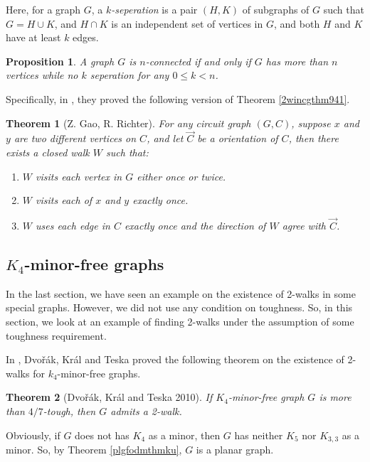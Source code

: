 \documentclass[12pt]{report}
\newtheorem{theorem}{Theorem}
\newtheorem{proposition}{Proposition}
\begin{document}
Here, for a graph $G$, a {\em $k$-seperation} is a pair $(H,K)$ of subgraphs of $G$ such that $G=H\cup K$, and $H\cap K$ is an independent set of vertices in $G$, and both $H$ and $K$ have at least $k$ edges.
\begin{proposition}
A graph $G$ is $n$-connected if and only if $G$ has more than $n$ vertices while no $k$ seperation for any $0\le k<n$.
\end{proposition}

Specifically, in \cite{gao19942}, they proved the following version of Theorem \ref{2wincgthm941}.

\begin{theorem}[Z. Gao, R. Richter]\label{2wincgde942}
For any circuit graph $(G,C)$, suppose $x$ and $y$ are two different vertices on $C$, and let $\vec{C}$ be a orientation of $C$, then there exists a closed walk $W$ such that:
\begin{enumerate}
\item $W$ visits each vertex in $G$ either once or twice.
\item $W$ visits each of $x$ and $y$ exactly once.
\item $W$ uses each edge in $C$ exactly once and the direction of $W$ agree with $\vec{C}$.
\end{enumerate}
\end{theorem}









\subsection{$K_4$-minor-free graphs}
In the last section, we have seen an example on the existence of 2-walks in some special graphs. However, we did not use any condition on toughness. So, in this section, we look at an example of finding 2-walks under the assumption of some toughness requirement.

In \cite{dvovrak2010toughness}, Dvo{\v r}{\'a}k, Kr{\'a}l and Teska proved the following theorem on the existence of 2-walks for $k_4$-minor-free graphs.
\begin{theorem}[Dvo{\v r}{\'a}k, Kr{\'a}l and Teska 2010]\label{thmk4mfg2w}
If $K_4$-minor-free graph $G$ is more than $4/7$-tough, then $G$ admits a 2-walk.
\end{theorem}

Obviously, if $G$ does not has $K_4$ as a minor, then $G$ has neither $K_5$ nor $K_{3,3}$ as a minor. So, by Theorem \ref{plgfodmthmku}, $G$ is a planar graph.
\end{document}
